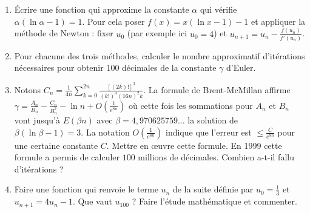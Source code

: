 \begin{frame}
\small
\begin{miniexercice}
\vspace*{-1ex}
\begin{enumerate}
\setlength{\itemsep}{0pt}
  \item \'Ecrire une fonction qui approxime la constante $\alpha$ qui vérifie $\alpha (\ln \alpha -1)=1$.
  Pour cela poser $f(x) = x(\ln x - 1)-1$ et appliquer la méthode de Newton : fixer $u_0$ (par exemple ici $u_0=4$)
  et $u_{n+1} = u_n - \frac{f(u_n)}{f'(u_n)}$.
  
  \item Pour chacune des trois méthodes, calculer le nombre approximatif d'itérations nécessaires
  pour obtenir $100$ décimales de la constante $\gamma$ d'Euler.
  
  \item Notons $C_n = \frac{1}{4n} \sum_{k=0}^{2n} \frac{[(2k)!]^3}{(k!)^4(16n)^2k}$.
  La formule de Brent-McMillan affirme $\gamma = \frac{A_n}{B_n} - \frac{C_n}{B_n^2} - \ln n + O(\frac{1}{e^{8n}})$
  où cette fois les sommations pour $A_n$ et $B_n$ vont jusqu'à $E(\beta n)$ avec
  $\beta = 4,970625759\ldots$ la solution de $\beta(\ln \beta - 1)=3$. La notation $O(\frac{1}{e^{8n}})$ 
  indique que l'erreur est $\le \frac{C}{e^{8n}}$ pour une certaine constante $C$.
  Mettre en \oe uvre cette formule. En 1999 cette formule a permis de calculer $100$ millions de décimales.
  Combien a-t-il fallu d'itérations ?
 
  \item Faire une fonction qui renvoie le terme $u_n$ de la suite définie par $u_0 = \frac 13$
  et $u_{n+1} = 4 u_n -1$. Que vaut $u_{100}$ ? Faire l'étude mathématique et commenter.

\end{enumerate}
\end{miniexercice}

\end{frame}

